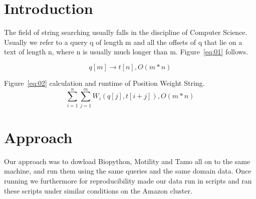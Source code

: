 \documentclass{bioinfo}
\begin{document}
\section{Introduction}
The field of string searching usually falls in the discipline of 
Computer Science.  Usually we refer to a query q of length m and all the
offsets of q that lie on a text of length n, where n is usually 
much longer than m.
Figure~\ref{eq:01} follows.

\begin{equation}
 q[m] \rightarrow t[n],   O(m*n)\label{eq:01}
\end{equation}



Figure~\ref{eq:02} calculation and runtime of Position Weight String.
\begin{equation}
  \sum_{i=1}^{n} \sum_{j=1}^{m} W_i (q[j], t[i+j]),   O(m*n)\label{eq:02}
\end{equation}




\section{Approach}
Our approach was to dowload Biopython, Motility and Tamo all on to 
the same machine, and run them using the same queries and the same domain data.
Once running we furthermore for reproducibility made our data run in scripts
and ran these scripts under similar conditions on the Amazon cluster.
\end{document}
